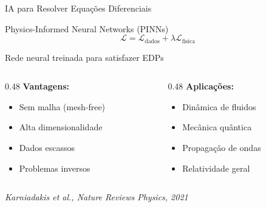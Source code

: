 \documentclass[aspectratio=169,12pt]{beamer}
\begin{document}
\begin{frame}{IA para Resolver Equações Diferenciais}
    \begin{block}{Physics-Informed Neural Networks (PINNs)}
        \begin{equation*}
            \mathcal{L} = \mathcal{L}_{\text{dados}} + \lambda \mathcal{L}_{\text{física}}
        \end{equation*}

        Rede neural treinada para satisfazer EDPs
    \end{block}

    \begin{columns}[T]
        \begin{column}{0.48\textwidth}
            \textbf{Vantagens:}
            \begin{itemize}
                \item Sem malha (mesh-free)
                \item Alta dimensionalidade
                \item Dados escassos
                \item Problemas inversos
            \end{itemize}
        \end{column}
        \begin{column}{0.48\textwidth}
            \textbf{Aplicações:}
            \begin{itemize}
                \item Dinâmica de fluidos
                \item Mecânica quântica
                \item Propagação de ondas
                \item Relatividade geral
            \end{itemize}
        \end{column}
    \end{columns}

    \vspace{0.3cm}
    \begin{center}
        \textit{Karniadakis et al., Nature Reviews Physics, 2021}
    \end{center}
\end{frame}
\end{document}
